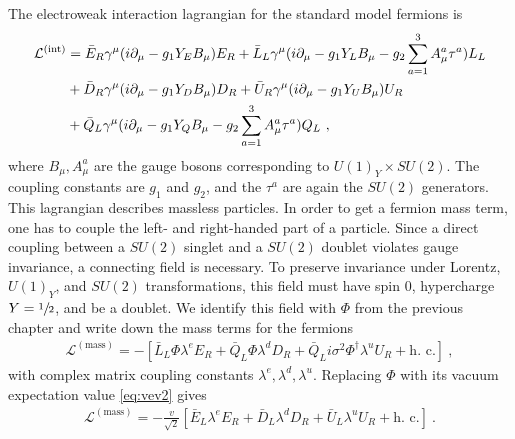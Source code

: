 The electroweak interaction lagrangian for the standard model fermions is
\begin{align}\label{eq:LFermion}
	\mathcal{L}^{(\text{int})} &= \bar{E}_R\gamma^\mu(i\partial_\mu-g_1Y_EB_\mu)E_R + \bar{L}_L\gamma^\mu(i\partial_\mu-g_1Y_LB_\mu-g_2\sum_{a=1}^{3}A_\mu^a\tau^a)L_L \notag \\
	&+ \bar{D}_R\gamma^\mu(i\partial_\mu-g_1Y_DB_\mu)D_R + \bar{U}_R\gamma^\mu(i\partial_\mu-g_1Y_UB_\mu)U_R \notag \\
	&+ \bar{Q}_L\gamma^\mu(i\partial_\mu-g_1Y_QB_\mu-g_2\sum_{a=1}^{3}A_\mu^a\tau^a)Q_L \ ,
\end{align}
where $B_\mu, A_\mu^a$ are the gauge bosons corresponding to $U(1)_Y\times SU(2)$. The coupling constants are $g_1$ and $g_2$, and the $\tau^a$ are again the $SU(2)$ generators. This lagrangian describes massless particles. In order to get a fermion mass term, one has to couple the left- and right-handed part of a particle. Since a direct coupling between a $SU(2)$ singlet and a $SU(2)$ doublet violates gauge invariance, a connecting field is necessary. To preserve invariance under Lorentz, $U(1)_Y$, and $SU(2)$ transformations, this field must have spin 0, hypercharge $Y=\sfrac{1}{2}$, and be a doublet. We identify this field with $\Phi$ from the previous chapter and write down the mass terms for the fermions
\begin{align*}
	\mathcal{L}^{(\text{mass})} = -\left[\bar{L}_L\Phi\lambda^e  E_R  + \bar{Q}_L\Phi\lambda^d D_R + \bar{Q}_Li\sigma^2\Phi^\dagger\lambda^u U_R + \text{h. c.}\right] \ ,
\end{align*}
with complex matrix coupling constants $\lambda^e,\lambda^d,\lambda^u$. Replacing $\Phi$ with its vacuum expectation value \eqref{eq:vev2} gives
\begin{align}\label{eq:LMass}
	\mathcal{L}^{(\text{mass})} = -\frac{v}{\sqrt{2}}\left[ \bar{E}_L\lambda^e E_R  + \bar{D}_L \lambda^dD_R + \bar{U}_L\lambda^u U_R + \text{h. c.}\right] \ .
\end{align}



